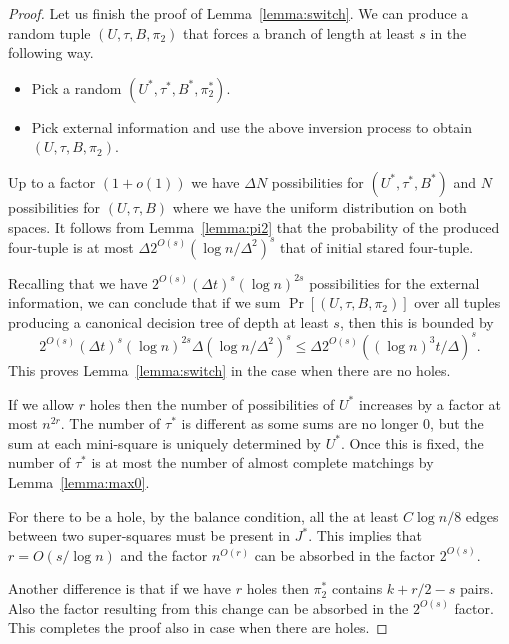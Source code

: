\documentclass{article}\usepackage[a4paper,margin=20mm]{geometry}
\begin{document}
\begin{proof}
Let us finish the proof of Lemma~\ref{lemma:switch}.
We can produce a random
tuple $(U, \tau, B, \pi_2)$ that forces a branch
of length at least $s$ in the following way.

\begin{itemize}

\item Pick a random $(U^*, \tau^*, B^*, \pi^*_2)$.

\item Pick external information and use the above
inversion process to obtain $(U, \tau, B, \pi_2)$.

\end{itemize}

Up to a factor $(1+o(1))$ we have $\Delta N$
possibilities for $(U^*, \tau^*, B^*)$ and
$N$ possibilities for $(U, \tau, B)$ where we have
the uniform distribution on both spaces.
It follows from Lemma~\ref{lemma:pi2}
that the probability of the produced four-tuple
is at most $\Delta 2^{O(s)} (\log n/\Delta^2)^s$ that of
initial stared four-tuple.

Recalling that we have $2^{O(s)} (\Delta t)^s (\log n)^{2s}$
possibilities for the external information, 
we can conclude that if we sum
$\Pr[(U, \tau, B, \pi_2)]$ over all tuples producing
a canonical decision tree of depth at least $s$,
then this is bounded by 
$$
2^{O(s)} (\Delta t)^s (\log n)^{2s} \Delta (\log n/\Delta^2)^s
\leq  \Delta 2^{O(s)} ((\log n)^3 t/\Delta)^s.
$$
This proves Lemma~\ref{lemma:switch} in the case when there are no holes.

If we allow $r$ holes then the number of possibilities
of $U^*$ increases by a factor at most $n^{2r}$.
The number of $\tau^*$ is different as some sums are
no longer $0$, but the sum at each mini-square is
uniquely determined by $U^*$.  Once this is fixed, the 
number of $\tau^*$ is at most the number of almost
complete matchings by Lemma~\ref{lemma:max0}.

For there to be a hole, by the balance condition,
all the at least $C \log n /8$ edges between two super-squares must
be present in $J^*$.  This implies that $r= O(s/ \log n)$
and the factor $n^{O(r)}$ can be absorbed in the 
factor $2^{O(s)}$.  

Another difference is that if we have $r$ holes then
$\pi_2^*$ contains $k+r/2-s$ pairs.  Also the factor
resulting from this change can be absorbed in
the $2^{O(s)}$ factor.  This completes the proof also in
case when there are holes.
\end{proof}
\end{document}
